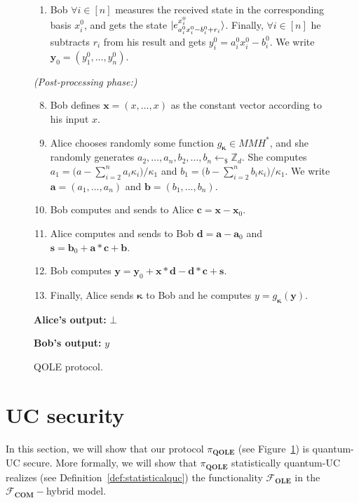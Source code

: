 \begin{figure}[h!]
\begin{tcolorbox}
\begin{enumerate}
        \item Bob  $\forall i\in [n]$ measures the received state in the corresponding basis  $x^0_i$, and gets the state $| e^{x^0_i}_{a^0_i x^0_i - b^0_i+r_i} \rangle$. Finally,  $\forall i\in [n]$ he subtracts $r_i$ from his result and gets $y^0_i = a^0_i x^0_i - b^0_i$. We write $\bm{y}_0 = (y^0_1, \ldots, y^0_n)$. 
    \end{enumerate}
        
    \textit{(Post-processing phase:)}

    \begin{enumerate}
    \setcounter{enumi}{7} 
        \item Bob defines $\bm{x} = (x, \ldots,x)$ as the constant vector according to his input $x$.
        \item Alice chooses randomly some function $g_{\bm{\kappa}} \in MMH^*$, and she randomly generates $a_2, \ldots, a_n, b_2, \ldots, b_n\leftarrow_{\$}\mathbb{Z}_d$. She computes $a_1 = \big(a - \sum_{i=2}^{n} a_i \kappa_i\big)/\kappa_1$ and $b_1 = \big(b - \sum_{i=2}^{n} b_i \kappa_i\big)/\kappa_1$. We write $\bm{a} = (a_1, \ldots, a_n)$ and $\bm{b} = (b_1, \ldots, b_n)$.
        \item Bob computes and sends to Alice $\bm{c} = \bm{x} - \bm{x}_0$.
        \item Alice computes and sends  to Bob $\bm{d} = \bm{a} - \bm{a}_0$ and $\bm{s} = \bm{b}_0 + \bm{a}  * \bm{c} + \bm{b}$.
        \item Bob computes $\bm{y} = \bm{y}_0 + \bm{x} * \bm{d} - \bm{d}* \bm{c} + \bm{s}$.
        \item Finally, Alice sends $\bm{\kappa}$ to Bob and he computes $y = g_{\bm{\kappa}}(\bm{y})$.
    \end{enumerate}


\textbf{Alice's output:} $\bot$

\textbf{Bob's output:} $y$
        
        \end{tcolorbox}
\caption{QOLE protocol.}
\label{fig:fullprotocol}
\end{figure}



\section{UC security}\label{secureQROLE_protocol}


In this section, we will show that our protocol  $\mathcal{\pi}_{\textbf{QOLE}}$ (see Figure~\ref{fig:fullprotocol}) is quantum-UC secure. More formally, we will show that $\mathcal{\pi}_{\textbf{QOLE}}$  statistically quantum-UC realizes  (see Definition~\ref{def:statisticalquc}) the functionality $\mathcal{F}_{\textbf{OLE}}$ in the $\mathcal{F}_{\textbf{COM}}-$hybrid model.

